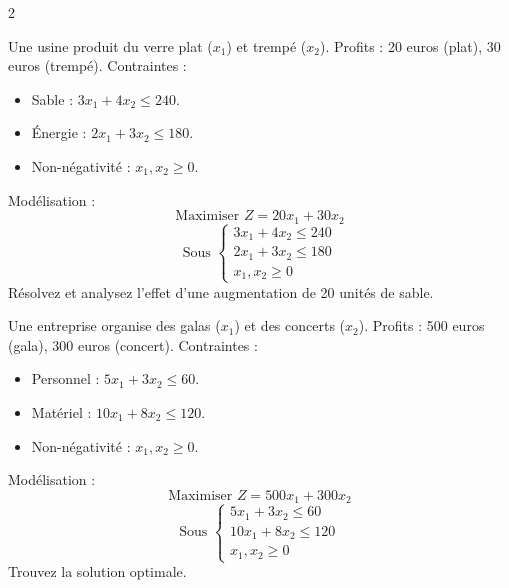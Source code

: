 \begin{multicols}{2}
\begin{exo}
	Une usine produit du verre plat (\(x_1\)) et trempé (\(x_2\)). Profits : 20 euros (plat), 30 euros (trempé). Contraintes :
	\begin{itemize}
		\item Sable : \(3x_1 + 4x_2 \leq 240\).
		\item Énergie : \(2x_1 + 3x_2 \leq 180\).
		\item Non-négativité : \(x_1, x_2 \geq 0\).
	\end{itemize}
	Modélisation :
	\[
	\text{Maximiser } Z = 20x_1 + 30x_2
	\]
	\[
	\text{Sous } \begin{cases}
	3x_1 + 4x_2 \leq 240 \\
	2x_1 + 3x_2 \leq 180 \\
	x_1, x_2 \geq 0
	\end{cases}
	\]
	Résolvez et analysez l'effet d'une augmentation de 20 unités de sable.
\end{exo}

\begin{exo}
	Une entreprise organise des galas (\(x_1\)) et des concerts (\(x_2\)). Profits : 500 euros (gala), 300 euros (concert). Contraintes :
	\begin{itemize}
		\item Personnel : \(5x_1 + 3x_2 \leq 60\).
		\item Matériel : \(10x_1 + 8x_2 \leq 120\).
		\item Non-négativité : \(x_1, x_2 \geq 0\).
	\end{itemize}
	Modélisation :
	\[
	\text{Maximiser } Z = 500x_1 + 300x_2
	\]
	\[
	\text{Sous } \begin{cases}
	5x_1 + 3x_2 \leq 60 \\
	10x_1 + 8x_2 \leq 120 \\
	x_1, x_2 \geq 0
	\end{cases}
	\]
	Trouvez la solution optimale.
\end{exo}


\end{multicols}
